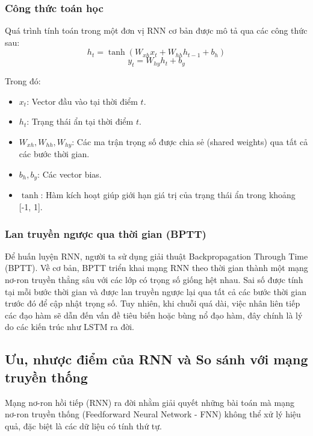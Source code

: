 \subsubsection{Công thức toán học}
Quá trình tính toán trong một đơn vị RNN cơ bản được mô tả qua các công thức sau:
\begin{equation}
    h_t = \tanh(W_{xh} x_t + W_{hh} h_{t-1} + b_h)
\end{equation}
\begin{equation}
    y_t = W_{hy} h_t + b_y
\end{equation}

Trong đó:
\begin{itemize}
    \item $x_t$: Vector đầu vào tại thời điểm $t$.
    \item $h_t$: Trạng thái ẩn tại thời điểm $t$.
    \item $W_{xh}, W_{hh}, W_{hy}$: Các ma trận trọng số được chia sẻ (shared weights) qua tất cả các bước thời gian.
    \item $b_h, b_y$: Các vector bias.
    \item $\tanh$: Hàm kích hoạt giúp giới hạn giá trị của trạng thái ẩn trong khoảng [-1, 1].
\end{itemize}

\subsubsection{Lan truyền ngược qua thời gian (BPTT)}
Để huấn luyện RNN, người ta sử dụng giải thuật Backpropagation Through Time (BPTT). Về cơ bản, BPTT triển khai mạng RNN theo thời gian thành một mạng nơ-ron truyền thẳng sâu với các lớp có trọng số giống hệt nhau. Sai số được tính tại mỗi bước thời gian và được lan truyền ngược lại qua tất cả các bước thời gian trước đó để cập nhật trọng số. Tuy nhiên, khi chuỗi quá dài, việc nhân liên tiếp các đạo hàm sẽ dẫn đến vấn đề tiêu biến hoặc bùng nổ đạo hàm, đây chính là lý do các kiến trúc như LSTM ra đời.

\subsection{Ưu, nhược điểm của RNN và So sánh với mạng truyền thống}

Mạng nơ-ron hồi tiếp (RNN) ra đời nhằm giải quyết những bài toán mà mạng nơ-ron truyền thống (Feedforward Neural Network - FNN) không thể xử lý hiệu quả, đặc biệt là các dữ liệu có tính thứ tự.

